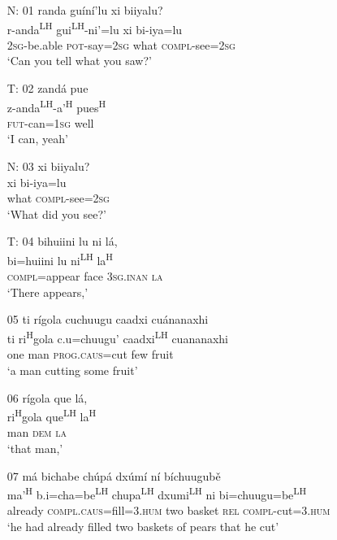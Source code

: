 

\begin{itemize}

\item[N: 01]
randa gu\'{i}n\'{i}'lu xi biiyalu? \\
r-anda\textsuperscript{LH} gui\textsuperscript{LH}-ni'=lu xi bi-iya=lu \\
\textsc{2sg}-be.able \textsc{pot}-say=\textsc{2sg} what \textsc{compl}-see=\textsc{2sg} \\
\glt `Can you tell what you saw?' 
 

\item[T: 02]
\glll zand\'{a} pue \\
z-anda\textsuperscript{LH}-a'\textsuperscript{H} pues\textsuperscript{H}  \\
\textsc{fut}-can=\textsc{1sg} well \\
\glt `I can, yeah'
 

\item[N: 03]
xi biiyalu? \\
xi bi-iya=lu \\
what \textsc{compl}-see=\textsc{2sg} \\
\glt `What did you see?'


\item[T: 04]
\glll bihuiini lu ni l\'{a}, \\
bi=huiini lu ni\textsuperscript{LH} la\textsuperscript{H} \\
\textsc{compl}=appear face \textsc{3sg.inan} \textsc{la} \\
\glt `There appears,'


\item[05]
\glll ti r\'{i}gola cuchuugu caadxi cu\'{a}nanaxhi \\
ti ri\textsuperscript{H}gola c.u=chuugu' caadxi\textsuperscript{LH} cuananaxhi \\
one man \textsc{prog}.\textsc{caus}=cut few fruit \\
\glt `a man cutting some fruit'


\item[06]
\glll r\'{i}gola que l\'{a},  \\
ri\textsuperscript{H}gola que\textsuperscript{LH} la\textsuperscript{H} \\
man \textsc{dem} \textsc{la} \\
\glt `that man,'


\item[07]
\glll m\'{a} bichabe ch\'{u}p\'{a} dx\'{u}m\'{i} n\'{i} b\'{i}chuugub\v{e} \\
ma'\textsuperscript{H} b.i=cha=be\textsuperscript{LH}  chupa\textsuperscript{LH} dxumi\textsuperscript{LH} ni bi=chuugu=be\textsuperscript{LH}  \\
already \textsc{compl}.\textsc{caus}=fill=\textsc{3.hum} two basket \textsc{rel} \textsc{compl}-cut=\textsc{3.hum} \\
\glt `he had already filled two baskets of pears that he cut'



\end{itemize}
